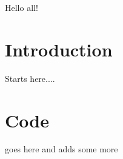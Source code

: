 \documentclass{article}
\begin{document}
Hello all!

\section{Introduction}

Starts here....

\section{Code}

goes here and adds some more
\end{document}
